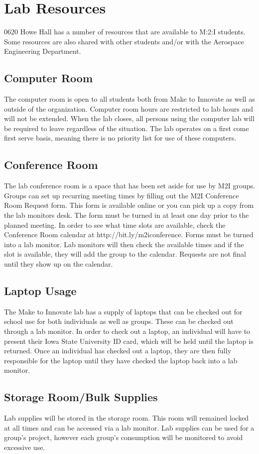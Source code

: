\chapter{Lab Resources}
0620 Howe Hall has a number of resources that are available to M:2:I students.  Some resources are also shared with other students and/or with the Aerospace Engineering Department.
\section{Computer Room}
The computer room is open to all students both from Make to Innovate as well as outside of the organization. Computer room hours are restricted to lab hours and will not be extended. When the lab closes, all persons using the computer lab will be required to leave regardless of the situation. The lab operates on a first come first serve basis, meaning there is no priority list for use of these computers.
\section{Conference Room}
The lab conference room is a space that has been set aside for use by M2I groups. Groups can set up recurring meeting times by filling out the M2I Conference Room Request form. This form is available online or you can pick up a copy from the lab monitors desk. The form must be turned in at least one day prior to the planned meeting. In order to see what time slots are available, check the Conference Room calendar at http://bit.ly/m2iconference. Forms must be turned into a lab monitor. Lab monitors will then check the available times and if the slot is available, they will add the group to the calendar. Requests are not final until they show up on the calendar.
\section{Laptop Usage}
The Make to Innovate lab has a supply of laptops that can be checked out for school use for both individuals as well as groups. These can be checked out through a lab monitor. In order to check out a laptop, an individual will have to present their Iowa State University ID card, which will be held until the laptop is returned. Once an individual has checked out a laptop, they are then fully responsible for the laptop until they have checked the laptop back into a lab monitor.
\section{Storage Room/Bulk Supplies}
Lab supplies will be stored in the storage room. This room will remained locked at all times and can be accessed via a lab monitor. Lab supplies can be used for a group's project, however each group's consumption will be monitored to avoid excessive use.